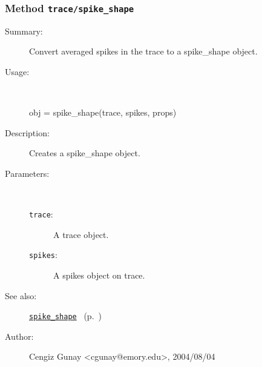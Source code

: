 \subsubsection[Method \texttt{spike\_shape}]{Method \texttt{trace/spike\_shape}}%
%
\label{ref_trace__spike_shape}%
\hypertarget{ref_trace__spike_shape}{}%
\begin{description}
\item[Summary:]Convert averaged spikes in the trace to a spike\_shape object.
%
\item[Usage:]~%
\begin{lyxcode}%
obj = spike\_shape(trace, spikes, props)
%
\end{lyxcode}%
%
\item[Description:]%
Creates a spike\_shape object.
\item[Parameters:]~
\begin{description}%
\item[\texttt{trace}:]
 A trace object.
\item[\texttt{spikes}:]
 A spikes object on trace.
\end{description}%
%
%
%
\item[See also:]%
\hyperlink{ref_spike_shape}{\texttt{spike\_shape}}%
\ (p.~\pageref{ref_spike_shape})%
%
%
\item[Author:]%
Cengiz Gunay <cgunay@emory.edu>, 2004/08/04%
\end{description}
\methodline%
